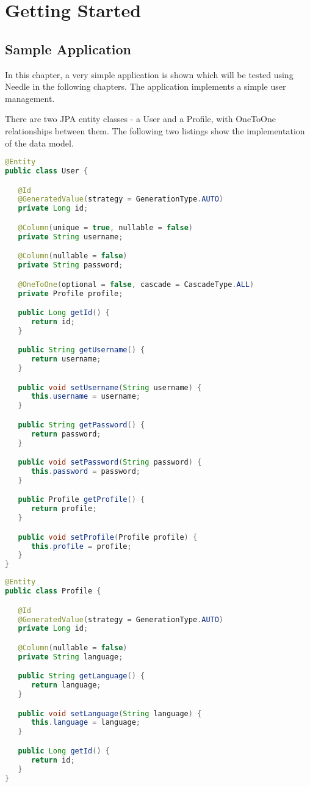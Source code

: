 \chapter{Getting Started}

\section{Sample Application}
\label{sec: Sample Application}
In this chapter, a very simple application is shown which will be tested using Needle in the following chapters.
The application implements a simple user management.

\parskip 14pt
\parindent 0pt
There are two JPA entity classes - a User and a Profile, with OneToOne relationships between them.
The following two listings show the implementation of the data model.

\begin{lstlisting}[language={JAVA},caption=The user entity]
@Entity
public class User {

   @Id
   @GeneratedValue(strategy = GenerationType.AUTO)
   private Long id;

   @Column(unique = true, nullable = false)
   private String username;

   @Column(nullable = false)
   private String password;

   @OneToOne(optional = false, cascade = CascadeType.ALL)
   private Profile profile;

   public Long getId() {
      return id;
   }

   public String getUsername() {
      return username;
   }

   public void setUsername(String username) {
      this.username = username;
   }

   public String getPassword() {
      return password;
   }

   public void setPassword(String password) {
      this.password = password;
   }

   public Profile getProfile() {
      return profile;
   }

   public void setProfile(Profile profile) {
      this.profile = profile;
   }
}
\end{lstlisting}


\begin{lstlisting}[language={JAVA},caption=The profile entity]
@Entity
public class Profile {

   @Id
   @GeneratedValue(strategy = GenerationType.AUTO)
   private Long id;

   @Column(nullable = false)
   private String language;

   public String getLanguage() {
      return language;
   }

   public void setLanguage(String language) {
      this.language = language;
   }

   public Long getId() {
      return id;
   }
}
\end{lstlisting}


